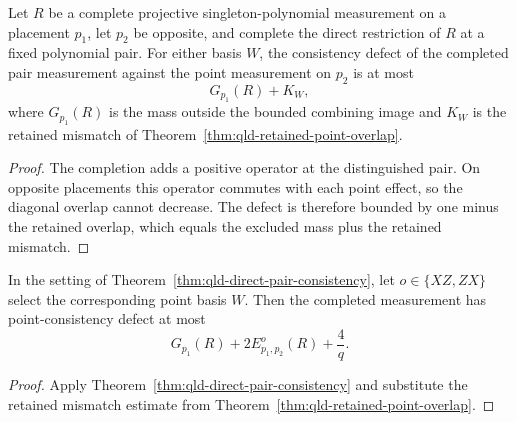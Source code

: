 \begin{theorem}
\label{thm:qld-direct-pair-consistency}
\leanok
{}
Let $R$ be a complete projective singleton-polynomial measurement on a
placement $p_1$, let $p_2$ be opposite, and complete the direct restriction of
$R$ at a fixed polynomial pair. For either basis $W$, the consistency defect of
the completed pair measurement against the point measurement on $p_2$ is at
most
\[
 G_{p_1}(R)+K_W,
\]
where $G_{p_1}(R)$ is the mass outside the bounded combining image and $K_W$ is
the retained mismatch of Theorem~\ref{thm:qld-retained-point-overlap}.
\end{theorem}
\begin{proof}
\leanok
{}
The completion adds a positive operator at the distinguished pair. On opposite
placements this operator commutes with each point effect, so the diagonal
overlap cannot decrease. The defect is therefore bounded by one minus the
retained overlap, which equals the excluded mass plus the retained mismatch.
\end{proof}

\begin{theorem}
\label{thm:qld-direct-pair-ordered-consistency}
\leanok
{}
In the setting of Theorem~\ref{thm:qld-direct-pair-consistency}, let
$o\in\{XZ,ZX\}$ select the corresponding point basis $W$. Then the completed
measurement has point-consistency defect at most
\[
 G_{p_1}(R)+2E^o_{p_1,p_2}(R)+\frac4q.
\]
\end{theorem}
\begin{proof}
\leanok
{}
Apply Theorem~\ref{thm:qld-direct-pair-consistency} and substitute the retained
mismatch estimate from Theorem~\ref{thm:qld-retained-point-overlap}.
\end{proof}

